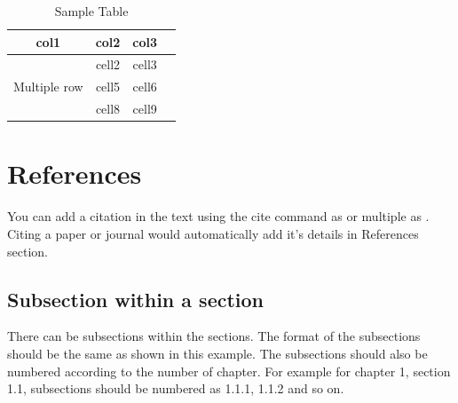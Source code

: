 \begin{table}[ht]
  \centering
  \caption{Sample Table}
  \label{tab:sample_table}
  \begin{tabular}{ |c|c|c|c| } 
    \hline
    col1 & col2 & col3 \\
    \hline
    \multirow{3}{4em}{Multiple row} & cell2 & cell3 \\ 
    & cell5 & cell6 \\ 
    & cell8 & cell9 \\ 
    \hline
  \end{tabular}
\end{table}

\section{References}
You can add a citation in the text using the cite command as \cite{big} or multiple as \cite{big,small}. Citing a paper or journal would automatically add it's details in References section.

\subsection{Subsection within a section}
There can be subsections within the sections. The format of the subsections should be the same as shown in this example. The subsections should also be numbered according to the number of chapter. For example for chapter 1, section 1.1, subsections should be numbered as 1.1.1, 1.1.2 and so on.

